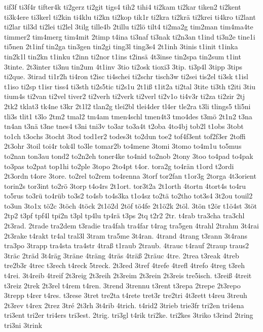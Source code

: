 {tif3f
ti3f4r
tifter4k
ti2gerz
ti2git
tigs4
tih2
tihi4
ti2kam
ti2kar
tiken2
ti2kent
ti3k4ere
ti3kerl
ti2kin
ti4klu
ti2kn
ti2kop
tik1r
ti2kra
ti2krä
ti2krei
ti4kro
ti2lant
ti2lar
til3d
ti2lei
ti2lel
3tilg
tille4b
2tillu
ti2lö
tilt4
ti2ma2g
tim2man
tim4ma4te
timmer2
tim4merg
tim4mit
2timp
t4ina
ti3naf
ti3nak
ti2n3an
t1ind
ti3n2e
tine1i
ti5nen
2t1inf
tin2ga
tin3gen
tin2gi
ting3l
ting3s4
2t1inh
3tinis
t1init
t1inka
tin2k1l
tin2kn
t1inku
t2inn
ti2nor
t1ins
t2insä
4t3inse
tin2spa
tin2sum
t1int
3tinte.
2t3inter
ti3nu
tin2um
4t1inv
3tio
ti2osk
tioxi3
3tip.
ti3p4l
3tipp
3tips
ti2que.
3tirad
ti1r2h
ti4ron
t2isc
ti4schei
ti2schr
tisch3w
ti2sei
tis2el
ti3sk
t1isl
t1iso
ti2sp
t1isr
tiss4
ti3sth
ti2s5tic
ti2s1u
2t1iß
t1it2a
ti2tal
3tite
ti3th
t2iti
3tiu
tium4s
ti2van
ti2vel
tiver2
ti2verh
ti2verk
ti2verl
ti2v1o
ti4v3r
ti2za
ti2zir
2tj
2tk2
tklat3
tk4ne
t3kr
2t1l2
tlan2g
tlei2bl
tlei4der
tl4er
tle2ra
t3li
tlings5
tli5ni
tli3s
tlit1
t3lo
2tm2
tmal2
tm4am
tmen4schl
tmen4t3
tmo4des
t3mö
2t1n2
t3na
tn4an
t3nä
t3ne
tnes4
t3ni
tni3v
to3ar
to3a4t
t2oba
4to4bj
tob2l
t1obs
3tobt
to1ch
t3ochs
3tocht
3tod
tod1er2
todes3t
to2dun
toe2
tof4f3ent
tof2f3er
2toffi
2t3ohr
3toil
toi4r
tok4l
to3le
tomar2b
to4mene
3tomi
3tomo
to4m1u
to5mus
to2nan
ton3au
tond2
to2n2eh
toner4ke
to4nid
to2nob
2tony
3too
to4pad
to4pak
to3pas
to2pat
top1hi
to2ple
3topo
2to4pt
t4or.
tora2g
to4rän
t1ord
t2ordi
2t3ordn
t4ore
3tore.
to2rel
to2rem
to4renna
3torf
tor2fan
t1or3g
2torga
4t3orient
torin2s
tor3int
to2rö
3torp
t4o4rs
2t1ort.
tor3t2a
2t1orth
4tortn
4tort4s
to4ru
to5rus
to3rü
to4rüb
to3s2
to4sb
to4s3ka
t1o4sz
to2tä
to2tho
tot3s4
3t2ou
touil2
to3un
3to1x
tö2c
3töch
4töck
2t1ö2d
2töf
tö4fe
2t1ö2k
2töl.
3tön
t2ör
t1ö4st
3töt
2tp2
t3pf
tpf4l
tpi2n
t3pl
tp4lu
tp4rä
t3ps
2tq
t2r2
2tr.
t4rab
tra3cha
tra3chl
2t3rad.
2trade
tra2dem
t3radie
tra4fah
tra4far
t4rag
tra5gen
4trahl
2trahm
3t4rai
2t3rake
t4rakt
tr4al
tral3l
3tram
tra5me
3t4ran.
4trand
4trang
t3rann
3t4rans
tra3po
3trapp
tra4sta
tra4str
4traß
t1raub
2traub.
4trauc
t4rauf
2traup
traus2
3träc
2träd
3t4räg
3träne
4träng
4träs
4träß
2träuc
4tre.
2trea
t3reak
4treb
tre2b3r
4trec
t3rech
t4reck
5treck.
2t3red
3tref
4trefe
4trefl
4trefo
4treg
t3reh
t4rei.
3t4reib
4treif
2t3reig
2t3reih
2t3reim
2t3rein
2t3reis
tre5isch.
t3reiß
4treit
t3reiz
2trek
2t3rel
t4rem
t4ren.
3trend
3trennu
t3rent
t3repa
2trepe
2t3repo
3trepp
t4rer
t4res.
t3rese
3tret
tre2ta
t4rete
tret3r
tre2tri
4t3rett
t4reu
3treuh
2t3rev
t4rex
2trez
3tré
2t3rh
3t4rib
4trich.
t4rid2
3trieb
trie3fr
tri2en
tri4ena
tri3ent
tri2er
tri4ers
tri3est.
2trig.
tri3gl
t4rik
tri2ke.
tri2kes
3triko
t3rind
2tring
tri3ni
3trink
}
